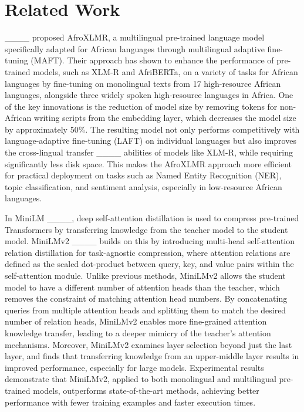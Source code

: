 \section{Related Work}
____ proposed AfroXLMR, a multilingual pre-trained language model specifically adapted for African languages through multilingual adaptive fine-tuning (MAFT). Their approach has shown to enhance the performance of pre-trained models, such as XLM-R and AfriBERTa, on a variety of tasks for African languages by fine-tuning on monolingual texts from 17 high-resource African languages, alongside three widely spoken high-resource languages in Africa. One of the key innovations is the reduction of model size by removing tokens for non-African writing scripts from the embedding layer, which decreases the model size by approximately 50\%. The resulting model not only performs competitively with language-adaptive fine-tuning (LAFT) on individual languages but also improves the cross-lingual transfer ____ abilities of models like XLM-R, while requiring significantly less disk space. This makes the AfroXLMR approach more efficient for practical deployment on tasks such as Named Entity Recognition (NER), topic classification, and sentiment analysis, especially in low-resource African languages.

In MiniLM ____, deep self-attention distillation is used to compress pre-trained Transformers by transferring knowledge from the teacher model to the student model. MiniLMv2 ____ builds on this by introducing multi-head self-attention relation distillation for task-agnostic compression, where attention relations are defined as the scaled dot-product between query, key, and value pairs within the self-attention module. Unlike previous methods, MiniLMv2 allows the student model to have a different number of attention heads than the teacher, which removes the constraint of matching attention head numbers. By concatenating queries from multiple attention heads and splitting them to match the desired number of relation heads, MiniLMv2 enables more fine-grained attention knowledge transfer, leading to a deeper mimicry of the teacher’s attention mechanisms. Moreover, MiniLMv2 examines layer selection beyond just the last layer, and finds that transferring knowledge from an upper-middle layer results in improved performance, especially for large models. Experimental results demonstrate that MiniLMv2, applied to both monolingual and multilingual pre-trained models, outperforms state-of-the-art methods, achieving better performance with fewer training examples and faster execution times.

